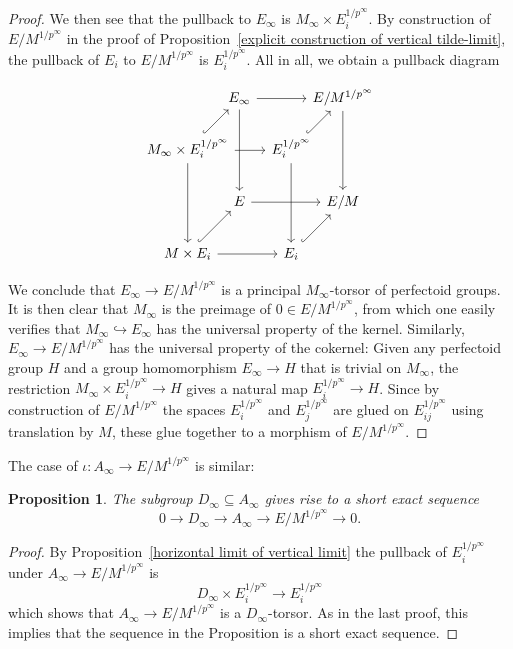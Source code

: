 \documentclass[10pt,oneside]{amsart}
\newtheorem{proposition}[theorem]{Proposition}
\theoremstyle{definition}
\theoremstyle{remark}
\begin{document}
\begin{proof}
		We then see that the pullback to $E_\infty$ is $M_\infty\times E_i^{1/p^\infty}$. 
		By construction of $E/M^{1/p^\infty}$ in the proof of Proposition~\ref{explicit construction of vertical tilde-limit}, the pullback of $E_i$ to $E/M^{1/p^\infty}$ is $E_i^{1/p^\infty}$. All in all, we obtain a pullback diagram
		\begin{center}
		\begin{equation}\label{pullback diagram covering map E inf to E/M^1/p^inf }
		\begin{tikzcd}[column sep={1.3cm,between origins},row sep={1.3cm,between origins}]
			& E_\infty \arrow[dd] \arrow[rr] &  & E/M^{1/p^\infty} \arrow[dd] \\
			M_\infty\times E_i^{1/p^\infty} \arrow[dd] \arrow[rr] \arrow[ru, hook] &  & E_i^{1/p^\infty} \arrow[dd] \arrow[ru, hook] &  \\
			& E \arrow[rr] &  & E/M \\
			M\times E_i \arrow[rr] \arrow[ru, hook] &  & E_i \arrow[ru, hook] & 
		\end{tikzcd}
		\end{equation}
		\end{center}
		We conclude that $E_\infty \rightarrow E/M^{1/p^\infty}$ is a principal $M_\infty$-torsor of perfectoid groups. It is then clear that $M_\infty$ is the preimage of $0\in E/M^{1/p^\infty}$, from which one easily verifies that $M_\infty\hookrightarrow E_\infty$ has the universal property of the kernel.
		Similarly, $E_\infty \rightarrow E/M^{1/p^\infty}$ has the universal property of the cokernel: Given any perfectoid group $H$ and a group homomorphism $E_\infty\rightarrow H$ that is trivial on $M_\infty$, the restriction $M_\infty\times E_i^{1/p^\infty}\rightarrow H$ gives a natural map $E_i^{1/p^\infty}\rightarrow H$. Since by construction of $E/M^{1/p^\infty}$ the spaces $E_i^{1/p^\infty}$ and $E_j^{1/p^\infty}$ are glued on $E_{ij}^{1/p^\infty}$ using translation by $M$, these glue together to a morphism of $E/M^{1/p^\infty}$.
	\end{proof}
	
	
	The case of $\iota:A_\infty \rightarrow E/M^{1/p^\infty}$ is similar:
	\begin{proposition}\label{the morphism A->E/M^{1/p^n} in the limit}
		The subgroup $D_\infty \subseteq A_\infty$ gives rise to a short exact sequence
		\[0\rightarrow D_\infty \rightarrow A_\infty\rightarrow E/M^{1/p^\infty}\rightarrow 0.\]
	
	\end{proposition}
	\begin{proof}
		By Proposition~\ref{horizontal limit of vertical limit} the pullback of $E_i^{1/p^\infty}$ under $A_\infty \rightarrow E/M^{1/p^\infty}$ is
		\[D_\infty \times E_i^{1/p^\infty}\rightarrow E_i^{1/p^\infty} \]
		which shows that $A_\infty\rightarrow E/M^{1/p^\infty}$ is a $D_\infty$-torsor. As in the last proof, this implies that the sequence in the Proposition is a short exact sequence.
	\end{proof}
	
\end{document}
